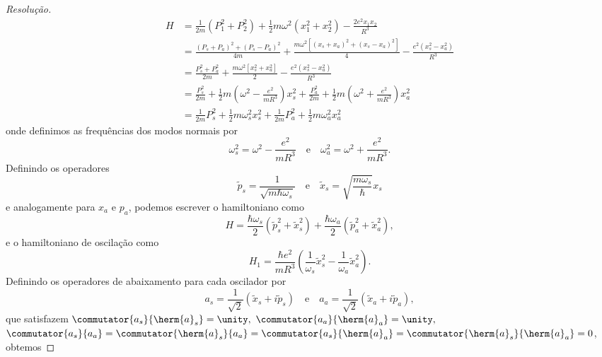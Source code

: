 \begin{proof}[Resolução]
    \begin{align*}
        H &= \frac{1}{2m}(P_1^2 + P_2^2) + \frac12 m \omega^2(x_1^2 + x_2^2) - \frac{2e^2x_1x_2}{R^3}\\
          &= \frac{(P_s + P_a)^2 + (P_s - P_a)^2}{4m} + \frac{m \omega^2\left[(x_s + x_a)^2 + (x_s - x_a)^2\right]}4  -\frac{e^2(x_s^2 - x_a^2)}{R^3}\\
          &= \frac{P_s^2 + P_a^2}{2m} + \frac{m \omega^2\left[x_s^2 + x_a^2\right]}2  -\frac{e^2(x_s^2 - x_a^2)}{R^3}\\
          &= \frac{P_s^2}{2m} + \frac12m\left(\omega^2 - \frac{e^2}{mR^3}\right)x_s^2 + \frac{P_a^2}{2m} + \frac12 m\left(\omega^2 + \frac{e^2}{m R^3}\right)x_a^2\\
          &= \frac{1}{2m}P_s^2 + \frac12 m \omega_s^2 x_s^2 + \frac{1}{2m}P_a^2 + \frac12 m \omega_a^2 x_a^2
    \end{align*}
    onde definimos as frequências dos modos normais por
    \begin{equation*}
        \omega_s^2 = \omega^2 - \frac{e^2}{mR^3}\quad\text{e}\quad\omega_a^2 = \omega^2 + \frac{e^2}{m R^3}.
    \end{equation*}
    Definindo os operadores
    \begin{equation*}
        \tilde{p}_s = \frac{1}{\sqrt{m\hbar \omega_s}}\quad\text{e}\quad \tilde{x}_s = \sqrt{\frac{m \omega_s}{\hbar}}x_s
    \end{equation*}
    e analogamente para \(x_a\) e \(p_a\), podemos escrever o hamiltoniano como
    \begin{equation*}
        H = \frac{\hbar \omega_s}{2}\left(\tilde{p}_s^2 + \tilde{x}_s^2\right) + \frac{\hbar \omega_a}{2}\left(\tilde{p}_a^2 + \tilde{x}_a^2\right),
    \end{equation*}
    e o hamiltoniano de oscilação como
    \begin{equation*}
        H_1 = \frac{\hbar e^2}{m R^3}\left(\frac{1}{\omega_s}\tilde{x}_s^2 - \frac{1}{\omega_a}\tilde{x}_a^2\right).
    \end{equation*}
    Definindo os operadores de abaixamento para cada oscilador por
    \begin{equation*}
        a_s = \frac1{\sqrt{2}}\left(\tilde{x}_s + i\tilde{p}_s\right)
        \quad\text{e}\quad
        a_a = \frac1{\sqrt{2}}\left(\tilde{x}_a + i\tilde{p}_a\right),
    \end{equation*}
    que satisfazem \(\commutator{a_s}{\herm{a}_s} = \unity,\) \(\commutator{a_a}{\herm{a}_a} = \unity,\) \(\commutator{a_s}{a_a} = \commutator{\herm{a}_s}{a_a} = \commutator{a_s}{\herm{a}_a} = \commutator{\herm{a}_s}{\herm{a}_a} = 0\), obtemos

\end{proof}
